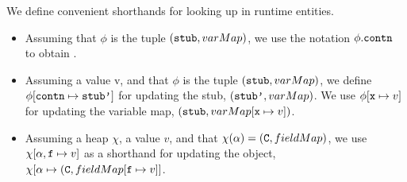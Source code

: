 \begin{definition}
We define convenient shorthands for looking up in  runtime entities.
\begin{itemize}
\item
Assuming that $\phi$ is the tuple  $({\mbox{\tt{stub}}}, varMap)$, we use the notation  $\phi.{\mbox{\tt{contn}}}$ to obtain .
\item
Assuming a value v, and that $\phi$ is the tuple  $({\mbox{\tt{stub}}}, varMap)$, we define $\phi[{\mbox{\tt{contn}}}\mapsto{\mbox{\tt{stub'}}}]$ for updating the stub, \ie
$({\mbox{\tt{stub'}}}, varMap)$.   We use  $\phi[{\mbox{\tt{x}}} \mapsto v]$  for updating the variable map, \ie  $({\mbox{\tt{stub}}}, varMap[{\mbox{\tt{x}}} \mapsto v])$.
\item
Assuming a heap $\chi$, a value $v$, and   that $\chi(\alpha)=({\mbox{\tt{C}}}, fieldMap)$,
we use $\chi[\alpha,{\mbox{\tt{f}}} \mapsto v]$ as a shorthand for updating the object, \ie $\chi[\alpha \mapsto ({\mbox{\tt{C}}}, fieldMap[{\mbox{\tt{f}}} \mapsto v]]$.
\end{itemize}

\end{definition}




